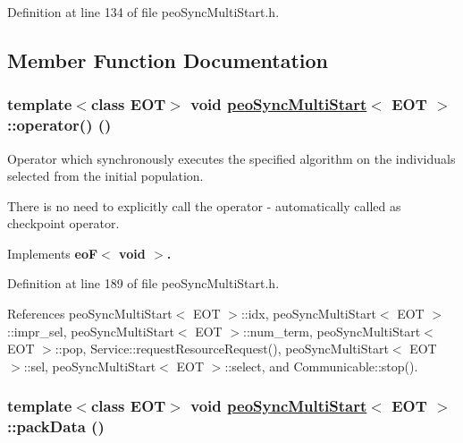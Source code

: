 Definition at line 134 of file peo\-Sync\-Multi\-Start.h.

\subsection{Member Function Documentation}
\hypertarget{classpeoSyncMultiStart_76385b33fe514f91cb83f0fbecbeb3c2}{
\subsubsection[operator()]{\setlength{\rightskip}{0pt plus 5cm}template$<$class EOT$>$ void \hyperlink{classpeoSyncMultiStart}{peo\-Sync\-Multi\-Start}$<$ EOT $>$::operator() ()}}
\label{classpeoSyncMultiStart_76385b33fe514f91cb83f0fbecbeb3c2}


Operator which synchronously executes the specified algorithm on the individuals selected from the initial population. 

There is no need to explicitly call the operator - automatically called as checkpoint operator. 

Implements \bf{eo\-F$<$ void $>$}.

Definition at line 189 of file peo\-Sync\-Multi\-Start.h.

References peo\-Sync\-Multi\-Start$<$ EOT $>$::idx, peo\-Sync\-Multi\-Start$<$ EOT $>$::impr\_\-sel, peo\-Sync\-Multi\-Start$<$ EOT $>$::num\_\-term, peo\-Sync\-Multi\-Start$<$ EOT $>$::pop, Service::request\-Resource\-Request(), peo\-Sync\-Multi\-Start$<$ EOT $>$::sel, peo\-Sync\-Multi\-Start$<$ EOT $>$::select, and Communicable::stop().\hypertarget{classpeoSyncMultiStart_8becfab1922b64708dca5a53e2932a5a}{
\subsubsection[packData]{\setlength{\rightskip}{0pt plus 5cm}template$<$class EOT$>$ void \hyperlink{classpeoSyncMultiStart}{peo\-Sync\-Multi\-Start}$<$ EOT $>$::pack\-Data ()}}
\label{classpeoSyncMultiStart_8becfab1922b64708dca5a53e2932a5a}


